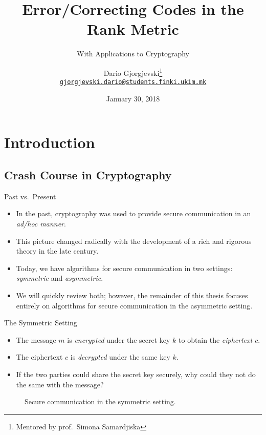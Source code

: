 \documentclass[usepdftitle=false]{beamer}
\title{Error\-/Correcting Codes in the Rank Metric}%
\subtitle{With Applications to Cryptography}%
\author[Dario Gj.]{%
  Dario Gjorgjevski\thanks{Mentored by prof.\ Simona Samardjiska}\\%
  \href{mailto:gjorgjevski.dario@students.finki.ukim.mk}%
  {\nolinkurl{gjorgjevski.dario@students.finki.ukim.mk}}%
}%
\institute[FCSE]{%
  Faculty of Computer Science and Engineering\\%
  Ss.\ Cyril and Methodius University in Skopje%
}%
\date{January 30, 2018}
\newcommand*{\enc}{\ensuremath{\mathsf{Enc}}}%
\newcommand*{\dec}{\ensuremath{\mathsf{Dec}}}%
\begin{document}
\begin{frame}
  \titlepage%
\end{frame}

\section{Introduction}

\subsection{Crash Course in Cryptography}

\begin{frame}{Past vs.\ Present}
  \begin{itemize}
  \item In the past, cryptography was used to provide secure
    communication in an \emph{ad\-/hoc manner}.
  \item This picture changed radically with the development of a rich
    and rigorous theory in the late  century.
  \item Today, we have algorithms for secure communication in two
    settings: \emph{\alert{symmetric}} and \emph{\alert{asymmetric}}.
  \item We will quickly review both; however, the remainder of this
    thesis focuses entirely on algorithms for secure communication in
    the asymmetric setting.
  \end{itemize}
\end{frame}

\begin{frame}{The Symmetric Setting}
  \begin{itemize}
  \item The message \(m\) is \emph{encrypted} under the secret key
    \(k\) to obtain the \emph{ciphertext} \(c\).
  \item The ciphertext \(c\) is \emph{decrypted} under \alert{the same
      key} \(k\).
  \item If the two parties could share the secret key securely, why
    could they not do the same with the message?
  \end{itemize}
  \begin{figure}
    \centering
    \caption{Secure communication in the symmetric setting.}
  \end{figure}
\end{frame}
\end{document}
